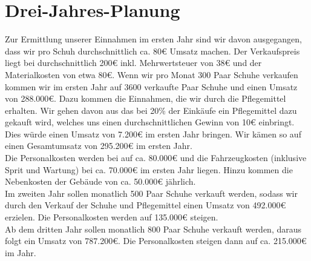 \chapter{Drei-Jahres-Planung}
\label{cha:9}
Zur Ermittlung unserer Einnahmen im ersten Jahr sind wir davon ausgegangen, dass wir pro Schuh durchschnittlich ca. 80€ Umsatz machen. Der Verkaufspreis liegt bei durchschnittlich 200€ inkl. Mehrwertsteuer von 38€ und der Materialkosten von etwa 80€.
Wenn wir pro Monat 300 Paar Schuhe verkaufen kommen wir im ersten Jahr auf 3600 verkaufte Paar Schuhe und einen Umsatz von 288.000€. Dazu kommen die Einnahmen, die wir durch die Pflegemittel erhalten. Wir gehen davon aus das bei 20\% der Einkäufe ein Pflegemittel dazu gekauft wird, welches uns einen durchschnittlichen Gewinn von 10€ einbringt. Dies würde einen Umsatz von 7.200€ im ersten Jahr bringen.
Wir kämen so auf einen Gesamtumsatz von 295.200€ im ersten Jahr.\\
Die Personalkosten werden bei auf ca. 80.000€ und die Fahrzeugkosten (inklusive Sprit und Wartung) bei ca. 70.000€ im ersten Jahr liegen. Hinzu kommen die Nebenkosten der Gebäude von ca. 50.000€ jährlich.\\
Im zweiten Jahr sollen monatlich 500 Paar Schuhe verkauft werden, sodass wir durch den Verkauf der Schuhe und Pflegemittel einen Umsatz von 492.000€ erzielen.
Die Personalkosten werden auf 135.000€ steigen.\\
Ab dem dritten Jahr sollen monatlich 800 Paar Schuhe verkauft werden, daraus folgt ein Umsatz von 787.200€. Die Personalkosten steigen dann auf ca. 215.000€ im Jahr.\\
